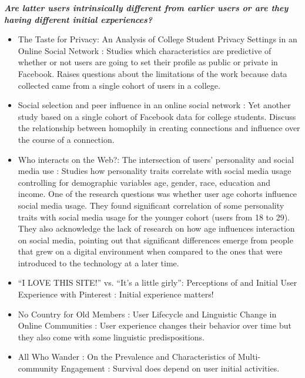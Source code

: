\textbf{\textit{Are latter users intrinsically different from earlier users or are they having different initial experiences?}}


\begin{itemize}
    \item The Taste for Privacy: An Analysis of College Student Privacy Settings in an Online Social Network \cite{Lewis2008}: Studies which characteristics are predictive of whether or not users are going to set their profile as public or private in Facebook. Raises questions about the limitations of the work because data collected came from a single cohort of users in a college.

    \item Social selection and peer influence in an online social network \cite{Lewis2012a}: Yet another study based on a single cohort of Facebook data for college students. Discuss the relationship between homophily in creating connections and influence over the course of a connection.

    \item Who interacts on the Web?: The intersection of users' personality and social media use \cite{Correa2010}: Studies how personality traits correlate with social media usage controlling for demographic variables age, gender, race, education and income. One of the research questions was whether user age cohorts influence social media usage. They found significant correlation of some personality traits with social media usage for the younger cohort (users from 18 to 29). They also acknowledge the lack of research on how age influences interaction on social media, pointing out that significant differences emerge from people that grew on a digital environment when compared to the ones that were introduced to the technology at a later time.

    \item ``I LOVE THIS SITE!'' vs. ``It's a little girly'': Perceptions of and Initial User Experience with Pinterest \cite{Miller2015}: Initial experience matters! 

    \item No Country for Old Members : User Lifecycle and Linguistic Change in Online Communities \cite{Danescu-niculescu-mizil2013}: User experience changes their behavior over time but they also come with some linguistic predispositions.

    \item All Who Wander : On the Prevalence and Characteristics of Multi-community Engagement \cite{Tan2015}: Survival does depend on user initial activities.


\end{itemize}

